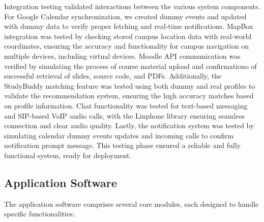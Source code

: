 \documentclass[12pt]{article}
\begin{document}
Integration testing validated interactions between the various system components. For Google Calendar synchronization, we created dummy events and updated with dummy data to verify proper fetching and real-time notifications.
MapBox integration was tested by checking stored campus location data with real-world coordinates, ensuring the accuracy and functionality for campus navigation on multiple devices, including virtual devices.
Moodle API communication was verified by simulating the process of course material upload and confirmationo of successful retrieval of slides, source code, and PDFs.
Additionally, the StudyBuddy matching feature was tested using both dummy and real profiles to validate the recommendation system, ensuring the high accuracy matches based on profile information.
Chat functionality was tested for text-based messaging and SIP-based VoIP audio calls, with the Linphone library ensuring seamless connection and clear audio quality.
Lastly, the notification system was tested by simulating calendar dummy events updates and incoming calls to confirm notification prompt message.
This testing phase ensured a reliable and fully functional system, ready for deployment.

\pagebreak

\subsection{Application Software}  
The application software comprises several core modules, each designed to handle specific functionalities:  
\end{document}
